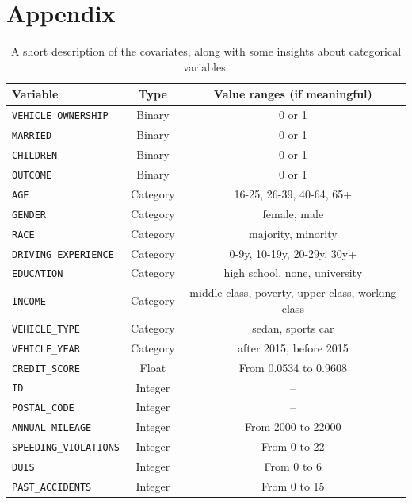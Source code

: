 \documentclass[a4paper,11pt, titlepage]{article}
\begin{document}
\newpage
\appendix


\section{Appendix}


\begin{table}[ht]
    \begin{tabular}[t]{|lcc|}
        \rowcolor{orange!30}
\hline
\textbf{Variable}           & \textbf{Type}      & \textbf{Value ranges (if meaningful)}     \\
\hline
{\tt VEHICLE\_OWNERSHIP}   & Binary    & 0 or 1                     \\
{\tt MARRIED}             & Binary    & 0 or 1                     \\
{\tt CHILDREN}            & Binary    & 0 or 1                    \\
{\tt OUTCOME}             & Binary    & 0 or 1                     \\
{\tt AGE}                 & Category    & 16-25, 26-39, 40-64, 65+      \\
{\tt GENDER}              & Category    & female, male                  \\
{\tt RACE}                & Category    & majority, minority            \\
{\tt DRIVING\_EXPERIENCE}  & Category    & 0-9y, 10-19y, 20-29y, 30y+     \\
{\tt EDUCATION}           & Category    & high school, none, university \\
{\tt INCOME}              & Category    & middle class, poverty, upper class, working class \\
{\tt VEHICLE\_TYPE}        & Category    & sedan, sports car             \\
{\tt VEHICLE\_YEAR}        & Category    & after 2015, before 2015       \\
{\tt CREDIT\_SCORE}        & Float     & From 0.0534 to 0.9608       \\
{\tt ID}                  & Integer   & --                \\
{\tt POSTAL\_CODE}         & Integer   & --             \\ 
{\tt ANNUAL\_MILEAGE}      & Integer   & From 2000 to 22000               \\ 

{\tt SPEEDING\_VIOLATIONS} & Integer   & From 0 to 22                   \\
{\tt DUIS}                & Integer   & From 0 to 6                      \\ 
{\tt PAST\_ACCIDENTS}      & Integer   & From 0 to 15                    \\  

\hline
    \end{tabular}
\centering
\caption{A short description of the covariates, along with some insights about categorical variables.}
\label{data-description}
\end{table}%
\end{document}
